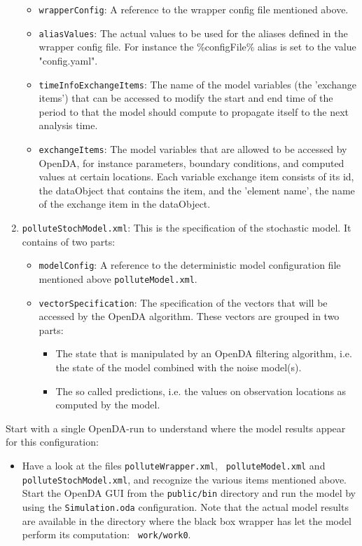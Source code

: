 \begin{enumerate}
\begin{itemize}
        \item {\tt wrapperConfig}: A reference to the wrapper config file
          mentioned above.
        \item {\tt aliasValues}: The actual values to be used for the aliases
          defined in the wrapper config file. For instance the \%configFile\%
          alias is set to the value "config.yaml".
        \item {\tt timeInfoExchangeItems}: The name of the model variables (the
          'exchange items') that can be accessed to modify the start and end
          time of the period to that the model should compute to propagate
          itself to the next analysis time.
        \item {\tt exchangeItems}: The model variables that are allowed to be
          accessed by OpenDA, for instance parameters, boundary conditions, and
          computed values at certain locations. Each variable exchange item
          consists of its id, the dataObject that contains the item, and the
          'element name', the name of the exchange item in the dataObject.
     \end{itemize}
   \item {\tt polluteStochModel.xml}: This is the specification of the
     stochastic model. It contains of two parts:
     \begin{itemize}
        \item {\tt modelConfig}: A reference to the deterministic model
          configuration file mentioned above {\tt polluteModel.xml}.
        \item {\tt vectorSpecification}: The specification of the vectors that
          will be accessed by the OpenDA algorithm. These vectors are grouped
          in two parts:
          \begin{itemize}
             \item The state that is manipulated by an OpenDA filtering
               algorithm, i.e. the state of the model combined with the noise
               model(s).
             \item The so called predictions, i.e. the values on observation
               locations as computed by the model.
          \end{itemize}
     \end{itemize}
\end{enumerate}

Start with a single OpenDA-run to understand where the model results appear
for this configuration:
\begin{itemize}
 \item Have a look at the files {\tt polluteWrapper.xml}, {\tt
   polluteModel.xml} and {\tt polluteStochModel.xml}, and recognize the various
   items mentioned above. Start the OpenDA GUI from the {\tt public/bin}
   directory and run the model by using the {\tt Simulation.oda} configuration.
   Note that the actual model results are available in the directory where the
   black box wrapper has let the model perform its computation: {\tt
     work/work0}.
\end{itemize}
